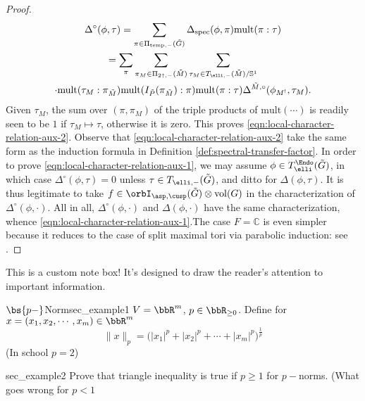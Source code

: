 \documentclass[11pt, a3paper, openany]{article}
\newcommand{\CC}{\ensuremath{\mathbb{C}}}
\newcommand{\mes}{\operatorname{vol}}
\theoremstyle{remark}
\theoremstyle{remark}
\theoremstyle{remark}
\newenvironment{Proof of claim}
  {\begin{proof}[\normalfont \textbf{Proof of claim}]}
  {\end{proof}}
\begin{document}
\begin{proof}
\begin{multline*}
\Delta^\circ(\phi, \tau) = \sum_{\pi \in \Pi_{\mathrm{temp}, -}(\tilde{G})} \Delta_{\mathrm{spec}}(\phi, \pi) \mathrm{mult}(\pi : \tau) \\
		= \sum_\pi \sum_{\pi_M \in \Pi_{2\uparrow, -}(\tilde{M})} \sum_{\tau_M \in T_{\elli, -}(\tilde{M})/\mathbb{S}^1} \\
		\cdot \mathrm{mult}(\tau_M : \pi_{\tilde{M}}) \mathrm{mult}(I_{\tilde{P}}(\pi_{\tilde{M}}) : \pi ) \mathrm{mult}(\pi : \tau) \Delta^{\tilde{M}, \circ}(\phi_{M^!}, \tau_M).
\end{multline*} Given $\tau_M$, the sum over $(\pi, \pi_M)$ of the triple products of $\mathrm{mult}(\cdots)$ is readily seen to be $1$ if $\tau_M \mapsto \tau$, otherwise it is zero. This proves \eqref{eqn:local-character-relation-aux-2}. Observe that \eqref{eqn:local-character-relation-aux-2} take the same form as the induction formula in Definition \ref{def:spectral-transfer-factor}. In order to prove \eqref{eqn:local-character-relation-aux-1}, we may assume $\phi \in T^{\Endo}_{\elli}(\tilde{G})$, in which case $\Delta^\circ(\phi, \tau) = 0$ unless $\tau \in T_{\elli, -}(\tilde{G})$, and ditto for $\Delta(\phi, \tau)$. It is thus legitimate to take $f \in \orbI_{\asp, \cusp}(\tilde{G}) \otimes \mes(G)$ in the characterization of $\Delta^\circ(\phi, \cdot)$. All in all, $\Delta^\circ(\phi, \cdot)$ and $\Delta(\phi, \cdot)$ have the same characterization, whence \eqref{eqn:local-character-relation-aux-1}.The case $F = \CC$ is even simpler because it reduces to the case of split maximal tori via parabolic induction: see \cite[\S 7.6]{Li19}.
\end{proof}
\begin{note}
This is a custom note box! It's designed to draw the reader's attention to important information.
\end{note}
\begin{Example}{$\bs{p-}$Norm}{sec_example1}
\label{pnorm}$V={\bbR}^m$, $p\in\bbR_{\geq 0}$. Define for $x=(x_1,x_2,\cdots,x_m)\in\bbR^m$ $$\|x\|_p=\Big(|x_1|^p+|x_2|^p+\cdots+|x_m|^p\Big)^{\frac1p}$$(In school $p=2$)
\end{Example}
\begin{Example}{}{sec_example2}
Prove that triangle inequality is true if $p\geq 1$ for $p-$norms. (What goes wrong for $p<1$
\end{Example}
\end{document}
